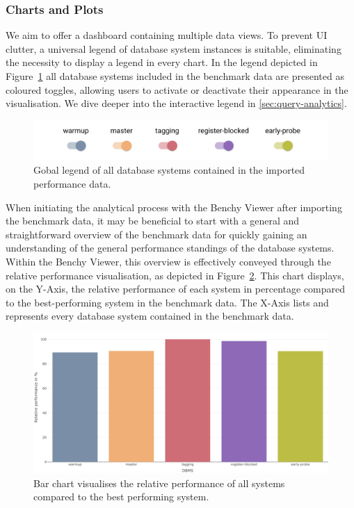 \subsubsection{Charts and Plots}

We aim to offer a dashboard containing multiple data views. To prevent UI clutter, a universal legend of database system instances is suitable, eliminating the necessity to display a legend in every chart. In the legend depicted in Figure~\ref{fig:legend} all database systems included in the benchmark data are presented as coloured toggles, allowing users to activate or deactivate their appearance in the visualisation. We dive deeper into the interactive legend in \ref{sec:query-analytics}.

\begin{figure}[h]
    \centering
    \includegraphics[width=1\linewidth]{figures/legend.png}
    \caption{Gobal legend of all database systems contained in the imported performance data.}
    \label{fig:legend}
  \end{figure}



When initiating the analytical process with the Benchy Viewer after importing the benchmark data, it may be beneficial to start with a general and straightforward overview of the benchmark data for quickly gaining an understanding of the general performance standings of the database systems.\\
Within the Benchy Viewer, this overview is effectively conveyed through the relative performance visualisation, as depicted in Figure~\ref{fig:relative-performance}. This chart displays, on the Y-Axis, the relative performance of each system in percentage compared to the best-performing system in the benchmark data. The X-Axis lists and represents every database system contained in the benchmark data.

\begin{figure}[h]
  \centering
  \includegraphics[width=1\linewidth]{figures/bsp-relative-performance.png}
  \caption{Bar chart visualises the relative performance of all systems compared to the best performing system.}
  \label{fig:relative-performance}
\end{figure}

